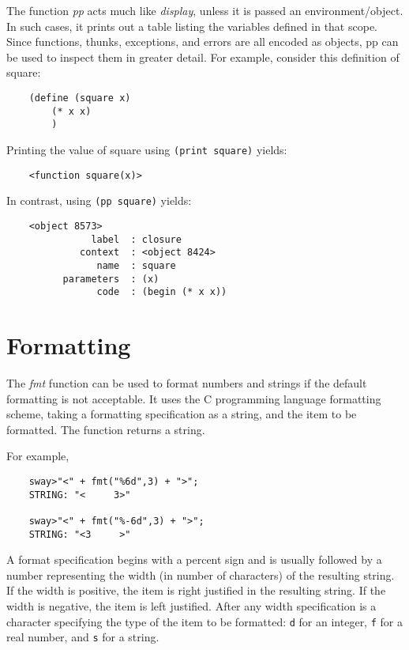 The function {\it pp} acts much like {\it display}, unless it is
passed an environment/object. In such cases, it prints out a table
listing the variables defined in that scope.
Since functions, thunks, exceptions, and errors are all encoded
as objects, pp can be used to inspect them in greater detail.
For example, consider this definition of square:

\begin{verbatim}
    (define (square x)
        (* x x)
        )
\end{verbatim}

Printing the value of square using \verb!(print square)! yields:

\begin{verbatim}
    <function square(x)>
\end{verbatim}

In contrast, using \verb!(pp square)! yields:

\begin{verbatim}
    <object 8573>
               label  : closure
             context  : <object 8424>
                name  : square
          parameters  : (x)
                code  : (begin (* x x))
\end{verbatim}

\section{Formatting}

The {\it fmt} function can be used to format numbers and strings
if the default formatting is not acceptable. It uses the C
programming language formatting scheme, taking a formatting
specification as a string, and the item to be formatted.
The function returns a string.

For example,

\begin{verbatim}
    sway>"<" + fmt("%6d",3) + ">";
    STRING: "<     3>"

    sway>"<" + fmt("%-6d",3) + ">";
    STRING: "<3     >"
\end{verbatim}

A format specification begins with a percent sign and is usually followed
by a number representing the width (in number of characters)
of the resulting string. If the width is positive, the
item is right justified in the resulting string. If the width
is negative, the item is left justified.
After any width specification is a character specifying the
type of the item to be formatted:
\verb!d! for an integer,
\verb!f! for a real number, and
\verb!s! for a string.

